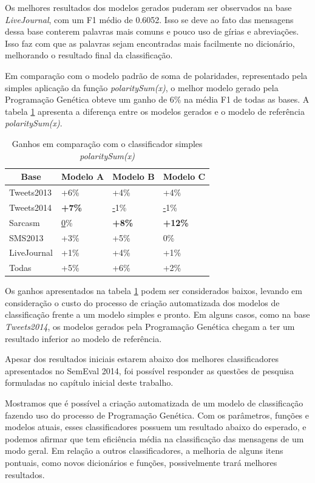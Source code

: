 \documentclass[12pt]{article}
\begin{document}
Os melhores resultados dos modelos gerados puderam ser observados na base \emph{LiveJournal}, com um F1 médio de 0.6052. Isso se deve ao fato das mensagens dessa base conterem palavras mais comuns e pouco uso de gírias e abreviações. Isso faz com que as palavras sejam encontradas mais facilmente no dicionário, melhorando o resultado final da classificação.

Em comparação com o modelo padrão de soma de polaridades, representado pela simples aplicação da função \emph{polaritySum(x)}, o melhor modelo gerado pela Programação Genética obteve um ganho de 6\% na média F1 de todas as bases. A tabela \ref{comparePolaritySum} apresenta a diferença entre os modelos gerados e o modelo de referência \emph{polaritySum(x)}.

\begin{table}[H]
\centering
\begin{tabular}{llll}
\multicolumn{1}{c}{\textbf{Base}} & \multicolumn{1}{c}{\textbf{Modelo A}} & \multicolumn{1}{c}{\textbf{Modelo B}} & \multicolumn{1}{c}{\textbf{Modelo C}} \\ \hline
Tweets2013 & +6\% & +4\% & +4\% \\ \hline
Tweets2014 & \textbf{+7\%} & {\ul -1\%} & {\ul -1\%} \\ \hline
Sarcasm & {\ul 0\%} & \textbf{+8\%} & \textbf{+12\%} \\ \hline
SMS2013 & +3\% & +5\% & 0\% \\ \hline
LiveJournal & +1\% & +4\% & +1\% \\ \hline
Todas & +5\% & +6\% & +2\% \\ \hline
\end{tabular}
\caption{Ganhos em comparação com o classificador simples \emph{polaritySum(x)}}
\label{comparePolaritySum}
\end{table}

Os ganhos apresentados na tabela \ref{comparePolaritySum} podem ser considerados baixos, levando em consideração o custo do processo de criação automatizada dos modelos de classificação frente a um modelo simples e pronto. Em alguns casos, como na base \emph{Tweets2014}, os modelos gerados pela Programação Genética chegam a ter um resultado inferior ao modelo de referência.

Apesar dos resultados iniciais estarem abaixo dos melhores classificadores apresentados no SemEval 2014, foi possível responder as questões de pesquisa formuladas no capítulo inicial deste trabalho. 

Mostramos que é possível a criação automatizada de um modelo de classificação fazendo uso do processo de Programação Genética. Com os parâmetros, funções e modelos atuais, esses classificadores possuem um resultado abaixo do esperado, e podemos afirmar que tem eficiência média na classificação das mensagens de um modo geral. Em relação a outros classificadores, a melhoria de alguns itens pontuais, como novos dicionários e funções, possivelmente trará melhores resultados.
\end{document}

